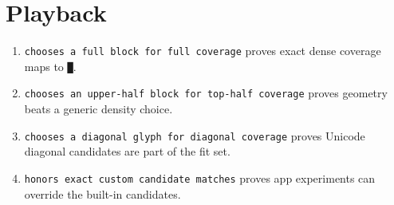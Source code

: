 \section{Playback}\label{record-160-playback}

\begin{enumerate}
\def\labelenumi{\arabic{enumi}.}
\tightlist
\item
  \texttt{c\allowbreak{}h\allowbreak{}o\allowbreak{}o\allowbreak{}s\allowbreak{}e\allowbreak{}s\allowbreak{} \allowbreak{}a\allowbreak{} \allowbreak{}f\allowbreak{}u\allowbreak{}l\allowbreak{}l\allowbreak{} \allowbreak{}b\allowbreak{}l\allowbreak{}o\allowbreak{}c\allowbreak{}k\allowbreak{} \allowbreak{}f\allowbreak{}o\allowbreak{}r\allowbreak{} \allowbreak{}f\allowbreak{}u\allowbreak{}l\allowbreak{}l\allowbreak{} \allowbreak{}c\allowbreak{}o\allowbreak{}v\allowbreak{}e\allowbreak{}r\allowbreak{}a\allowbreak{}g\allowbreak{}e} proves exact dense coverage maps to \texttt{█}.
\item
  \texttt{c\allowbreak{}h\allowbreak{}o\allowbreak{}o\allowbreak{}s\allowbreak{}e\allowbreak{}s\allowbreak{} \allowbreak{}a\allowbreak{}n\allowbreak{} \allowbreak{}u\allowbreak{}p\allowbreak{}p\allowbreak{}e\allowbreak{}r\allowbreak{}-\allowbreak{}h\allowbreak{}a\allowbreak{}l\allowbreak{}f\allowbreak{} \allowbreak{}b\allowbreak{}l\allowbreak{}o\allowbreak{}c\allowbreak{}k\allowbreak{} \allowbreak{}f\allowbreak{}o\allowbreak{}r\allowbreak{} \allowbreak{}t\allowbreak{}o\allowbreak{}p\allowbreak{}-\allowbreak{}h\allowbreak{}a\allowbreak{}l\allowbreak{}f\allowbreak{} \allowbreak{}c\allowbreak{}o\allowbreak{}v\allowbreak{}e\allowbreak{}r\allowbreak{}a\allowbreak{}g\allowbreak{}e} proves geometry beats a generic density choice.
\item
  \texttt{c\allowbreak{}h\allowbreak{}o\allowbreak{}o\allowbreak{}s\allowbreak{}e\allowbreak{}s\allowbreak{} \allowbreak{}a\allowbreak{} \allowbreak{}d\allowbreak{}i\allowbreak{}a\allowbreak{}g\allowbreak{}o\allowbreak{}n\allowbreak{}a\allowbreak{}l\allowbreak{} \allowbreak{}g\allowbreak{}l\allowbreak{}y\allowbreak{}p\allowbreak{}h\allowbreak{} \allowbreak{}f\allowbreak{}o\allowbreak{}r\allowbreak{} \allowbreak{}d\allowbreak{}i\allowbreak{}a\allowbreak{}g\allowbreak{}o\allowbreak{}n\allowbreak{}a\allowbreak{}l\allowbreak{} \allowbreak{}c\allowbreak{}o\allowbreak{}v\allowbreak{}e\allowbreak{}r\allowbreak{}a\allowbreak{}g\allowbreak{}e} proves Unicode diagonal candidates are part of the fit set.
\item
  \texttt{h\allowbreak{}o\allowbreak{}n\allowbreak{}o\allowbreak{}r\allowbreak{}s\allowbreak{} \allowbreak{}e\allowbreak{}x\allowbreak{}a\allowbreak{}c\allowbreak{}t\allowbreak{} \allowbreak{}c\allowbreak{}u\allowbreak{}s\allowbreak{}t\allowbreak{}o\allowbreak{}m\allowbreak{} \allowbreak{}c\allowbreak{}a\allowbreak{}n\allowbreak{}d\allowbreak{}i\allowbreak{}d\allowbreak{}a\allowbreak{}t\allowbreak{}e\allowbreak{} \allowbreak{}m\allowbreak{}a\allowbreak{}t\allowbreak{}c\allowbreak{}h\allowbreak{}e\allowbreak{}s} proves app experiments can override the built-in candidates.

\end{enumerate}
